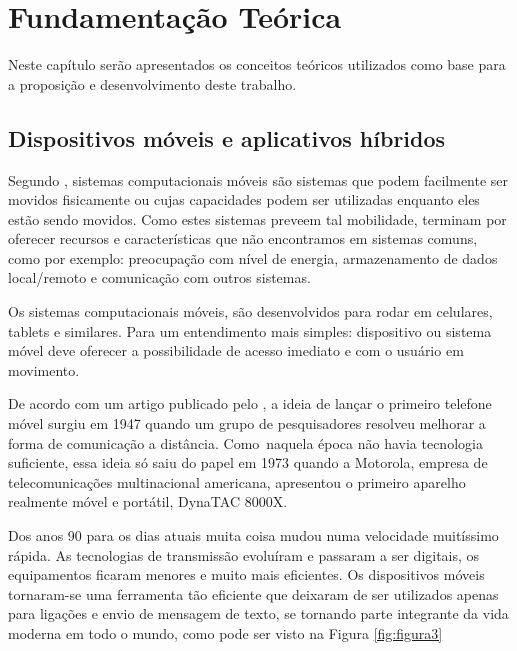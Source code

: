 \chapter{Fundamentação Teórica} \label{cha:fundamentacao}

Neste capítulo serão apresentados os conceitos teóricos utilizados como base para a proposição e desenvolvimento deste trabalho.

\section{Dispositivos móveis e aplicativos híbridos}

Segundo \citeauthor{b2005mobile}, sistemas computacionais móveis são sistemas que podem facilmente ser movidos fisicamente ou cujas capacidades podem ser utilizadas enquanto eles estão sendo movidos. Como estes sistemas preveem tal mobilidade, terminam por oferecer recursos e características que não encontramos em sistemas comuns, como por exemplo: preocupação com nível de energia, armazenamento de dados local/remoto e comunicação com outros sistemas.

Os sistemas computacionais móveis, são desenvolvidos para rodar em celulares, tablets e similares. Para um entendimento mais simples: dispositivo ou sistema móvel deve oferecer a possibilidade de acesso imediato e com o usuário em movimento.

De acordo com um artigo publicado pelo \citeauthor{firstmobile}, a ideia de lançar o primeiro telefone móvel surgiu em 1947 quando um grupo de pesquisadores resolveu melhorar a forma de comunicação a distância. Como naquela época não havia tecnologia suficiente,  essa ideia só saiu do papel em 1973 quando a Motorola, empresa de telecomunicações multinacional americana, apresentou o primeiro aparelho realmente móvel e portátil, DynaTAC 8000X. 

Dos anos 90 para os dias atuais muita coisa mudou numa  velocidade muitíssimo rápida. As tecnologias de transmissão evoluíram e passaram a ser digitais, os equipamentos ficaram menores e muito mais eficientes. Os dispositivos móveis tornaram-se uma ferramenta tão eficiente que deixaram de ser utilizados apenas para ligações e envio de mensagem de texto, se tornando parte integrante da vida moderna em todo o mundo, como pode ser visto na Figura \ref{fig:figura3} 

